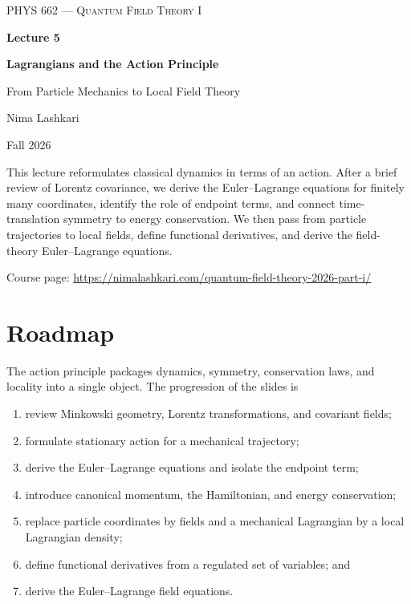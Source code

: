 \documentclass[11pt]{article}
\begin{document}
\begin{titlepage}
\centering
\vspace*{1.2in}
{\scshape\Large PHYS 662 --- Quantum Field Theory I\par}
\vspace{0.35in}
{\Huge\bfseries\color{qftblue} Lecture 5\par}
\vspace{0.15in}
{\LARGE\bfseries Lagrangians and the Action Principle\par}
\vspace{0.12in}
{\Large\color{qftgreen} From Particle Mechanics to Local Field Theory\par}
\vspace{0.6in}
{\large Nima Lashkari\par}
{\large Fall 2026\par}
\vfill
\begin{minipage}{0.86\textwidth}
\small
This lecture reformulates classical dynamics in terms of an action. After a
brief review of Lorentz covariance, we derive the Euler--Lagrange equations
for finitely many coordinates, identify the role of endpoint terms, and
connect time-translation symmetry to energy conservation. We then pass from
particle trajectories to local fields, define functional derivatives, and
derive the field-theory Euler--Lagrange equations.

\medskip
Course page: \url{https://nimalashkari.com/quantum-field-theory-2026-part-i/}
\end{minipage}
\vspace{0.5in}
\end{titlepage}

\tableofcontents
\newpage
{}

\section*{Roadmap}

The action principle packages dynamics, symmetry, conservation laws, and
locality into a single object. The progression of the slides is
\begin{enumerate}
  \item review Minkowski geometry, Lorentz transformations, and covariant
  fields;
  \item formulate stationary action for a mechanical trajectory;
  \item derive the Euler--Lagrange equations and isolate the endpoint term;
  \item introduce canonical momentum, the Hamiltonian, and energy
  conservation;
  \item replace particle coordinates by fields and a mechanical Lagrangian by
  a local Lagrangian density;
  \item define functional derivatives from a regulated set of variables; and
  \item derive the Euler--Lagrange field equations.
\end{enumerate}
\end{document}
